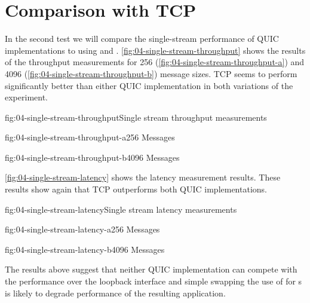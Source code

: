 \section{Comparison with TCP}

In the second test we will compare the single-stream performance of QUIC implementations to using
\TcpClient{} and \SslStream{}. \autoref{fig:04-single-stream-throughput} shows the results of the
throughput measurements for \SI{256}{\byte} (\autoref{fig:04-single-stream-throughput-a}) and
\SI{4096}{\byte} (\autoref{fig:04-single-stream-throughput-b}) message sizes. TCP seems to perform
significantly better than either QUIC implementation in both variations of the experiment.

\begin{myFigure}{fig:04-single-stream-throughput}{Single stream throughput measurements}
\begin{mySubfigure}{0.49\linewidth}{fig:04-single-stream-throughput-a}{\SI{256}{\byte} Messages}
\footnotesize

\end{mySubfigure}
\begin{mySubfigure}{0.49\linewidth}{fig:04-single-stream-throughput-b}{\SI{4096}{\byte} Messages}
\footnotesize

\end{mySubfigure}
\end{myFigure}

\autoref{fig:04-single-stream-latency} shows the latency measurement results. These results show
again that TCP outperforms both QUIC implementations.

\begin{myFigure}{fig:04-single-stream-latency}{Single stream latency measurements}
\begin{mySubfigure}{0.49\linewidth}{fig:04-single-stream-latency-a}{\SI{256}{\byte} Messages}
\footnotesize

\end{mySubfigure}
\begin{mySubfigure}{0.49\linewidth}{fig:04-single-stream-latency-b}{\SI{4096}{\byte} Messages}
\footnotesize

\end{mySubfigure}
\end{myFigure}

The results above suggest that neither QUIC implementation can compete with the \SslStream{}
performance over the loopback interface and simple swapping the use of \SslStream{} for
\QuicStream{}s is likely to degrade performance of the resulting application.

